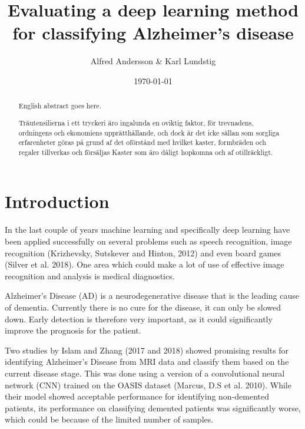 \documentclass{kththesis}
\title{Evaluating a deep learning method for classifying Alzheimer's disease}
\author{Alfred Andersson \& Karl Lundstig}
\date{\today}
\begin{document}
\frontmatter

\titlepage

\begin{abstract}
  English abstract goes here.

\end{abstract}


\begin{otherlanguage}{swedish}
  \begin{abstract}
    Träutensilierna i ett tryckeri äro ingalunda en oviktig faktor,
    för trevnadens, ordningens och ekonomiens upprätthållande, och
    dock är det icke sällan som sorgliga erfarenheter göras på grund
    af det oförstånd med hvilket kaster, formbräden och regaler
    tillverkas och försäljas Kaster som äro dåligt hopkomna och af
    otillräckligt.
  \end{abstract}
\end{otherlanguage}


\tableofcontents


\mainmatter


\chapter{Introduction}

In the last couple of years machine learning and specifically deep learning have been applied successfully on several problems such as speech recognition, image recognition (Krizhevsky, Sutskever and Hinton, 2012) and even board games (Silver et al. 2018). One area which could make a lot of use of effective image recognition and analysis is medical diagnostics.

Alzheimer’s Disease (AD) is a neurodegenerative disease that is the leading cause of dementia. Currently there is no cure for the disease, it can only be slowed down. Early detection is therefore very important, as it could significantly improve the prognosis for the patient.

Two studies by Islam and Zhang (2017 and 2018) showed promising results for identifying Alzheimer’s Disease from MRI data and classify them based on the current disease stage. This was done using a version of a convolutional neural network (CNN) trained on the OASIS dataset (Marcus, D.S et al. 2010). While their model showed acceptable performance for identifying non-demented patients, its performance on classifying demented patients was significantly worse, which could be because of the limited number of samples. 
\end{document}
